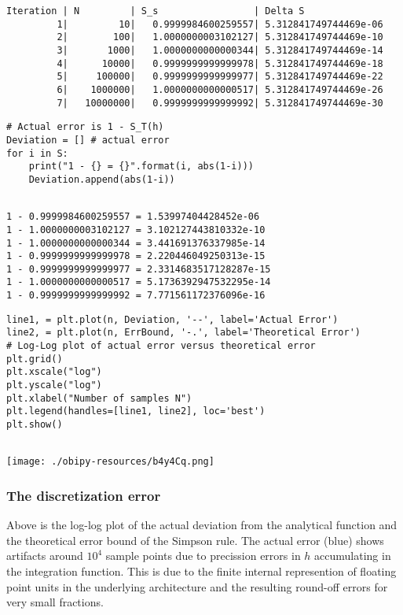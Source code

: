 \documentclass[11pt]{article}
\begin{document}
\begin{verbatim}
Iteration | N         | S_s                 | Delta S             
         1|         10|   0.9999984600259557| 5.312841749744469e-06
         2|        100|   1.0000000003102127| 5.312841749744469e-10
         3|       1000|   1.0000000000000344| 5.312841749744469e-14
         4|      10000|   0.9999999999999978| 5.312841749744469e-18
         5|     100000|   0.9999999999999977| 5.312841749744469e-22
         6|    1000000|   1.0000000000000517| 5.312841749744469e-26
         7|   10000000|   0.9999999999999992| 5.312841749744469e-30
\end{verbatim}

\begin{verbatim}
# Actual error is 1 - S_T(h)
Deviation = [] # actual error
for i in S:
    print("1 - {} = {}".format(i, abs(1-i)))
    Deviation.append(abs(1-i))


\end{verbatim}

\begin{verbatim}
1 - 0.9999984600259557 = 1.53997404428452e-06
1 - 1.0000000003102127 = 3.102127443810332e-10
1 - 1.0000000000000344 = 3.441691376337985e-14
1 - 0.9999999999999978 = 2.220446049250313e-15
1 - 0.9999999999999977 = 2.3314683517128287e-15
1 - 1.0000000000000517 = 5.1736392947532295e-14
1 - 0.9999999999999992 = 7.771561172376096e-16
\end{verbatim}

\begin{verbatim}
line1, = plt.plot(n, Deviation, '--', label='Actual Error')
line2, = plt.plot(n, ErrBound, '-.', label='Theoretical Error')
# Log-Log plot of actual error versus theoretical error
plt.grid()
plt.xscale("log")
plt.yscale("log")
plt.xlabel("Number of samples N")
plt.legend(handles=[line1, line2], loc='best')
plt.show()


\end{verbatim}

\begin{center}
\texttt{[image: ./obipy-resources/b4y4Cq.png]}
\end{center}

\subsubsection{The discretization error}
\label{sec:orgc9eeec8}

Above is the log-log plot of the actual deviation from the analytical function and 
the theoretical error bound of the Simpson rule. The actual error (blue) shows artifacts 
around \(10^4\) sample points due to precission errors in \(h\) accumulating in the integration function. 
This is due to the finite internal represention of floating point units in the underlying architecture 
and the resulting round-off errors for very small fractions.
\end{document}
